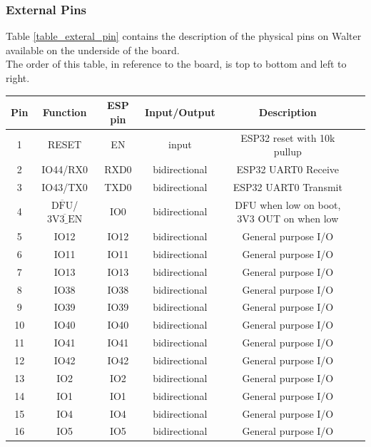\documentclass[11pt]{article}
\newcommand{\textoverline}[1]{$\overline{\mbox{#1}}$}
\begin{document}
\subsubsection{External Pins} \label{external_pins}
Table \ref{table_exteral_pin} contains the description of the physical pins on Walter available on the underside of the board. \\
The order of this table, in reference to the board, is top to bottom and left to right.\\
\renewcommand{\arraystretch}{1.5}
\begin{table}[!h]
\begin{center}
\begin{tabular}{|c|c|c|c|c|p{9.5cm}|}
\hline
{\bf Pin} & {\bf Function} & \multicolumn{1}{c|}{\bf ESP pin} & \multicolumn{1}{c|}{\bf Input/Output} & \multicolumn{1}{c|}{\bf Description} \\
\hline
\hline
1 & RESET & EN & input & ESP32 reset with 10k pullup \\
\hline
2 & IO44/RX0 & RXD0 & bidirectional & ESP32 UART0 Receive \\
\hline
3 & IO43/TX0 & TXD0 & bidirectional & ESP32 UART0 Transmit \\
\hline
4 & \textoverline{DFU}/\textoverline{3V3\_EN} & IO0 & bidirectional & DFU when low on boot, 3V3 OUT on when low \\
\hline
5 & IO12 & IO12 & bidirectional & General purpose I/O \\
\hline
6 & IO11 & IO11 & bidirectional & General purpose I/O \\
\hline
7 & IO13 & IO13 & bidirectional & General purpose I/O \\
\hline
8 & IO38 & IO38 & bidirectional & General purpose I/O \\
\hline
9 & IO39 & IO39 & bidirectional & General purpose I/O \\
\hline
10 & IO40 & IO40 & bidirectional & General purpose I/O \\
\hline
11 & IO41 & IO41 & bidirectional & General purpose I/O \\
\hline
12 & IO42 & IO42 & bidirectional & General purpose I/O \\
\hline
13 & IO2 & IO2 & bidirectional & General purpose I/O \\
\hline
14 & IO1 & IO1 & bidirectional & General purpose I/O \\
\hline
15 & IO4 & IO4 & bidirectional & General purpose I/O \\
\hline
16 & IO5 & IO5 & bidirectional & General purpose I/O \\

\end{tabular}
\end{center}
\end{table}
\end{document}
